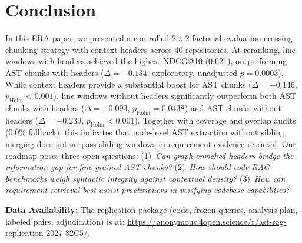 \section{Conclusion}
\label{sec:conclusion}
In this ERA paper, we presented a controlled $2 \times 2$ factorial evaluation crossing chunking strategy with context headers across 40 repositories. 
At reranking, line windows with headers achieved the highest NDCG@10 (0.621), outperforming AST chunks with headers ($\Delta = -0.134$; exploratory, unadjusted $p = 0.0003$). While context headers provide a substantial boost for AST chunks ($\Delta = +0.146$, $p_{\mathrm{Holm}} < 0.001$), line windows without headers significantly outperform both AST chunks with headers ($\Delta = -0.093$, $p_{\mathrm{Holm}} = 0.0438$) and AST chunks without headers ($\Delta = -0.239$, $p_{\mathrm{Holm}} < 0.001$). 
Together with coverage and overlap audits (0.0\% fallback), this indicates that node-level AST extraction without sibling merging does not surpass sliding windows in requirement evidence retrieval. 
Our roadmap poses three open questions: (1)~\textit{Can graph-enriched headers bridge the information gap for fine-grained AST chunks?} (2)~\textit{How should code-RAG benchmarks weigh syntactic integrity against contextual density?} (3)~\textit{How can requirement retrieval best assist practitioners in verifying codebase capabilities?}

\smallskip\noindent\textbf{Data Availability:} The replication package (code, frozen queries, analysis plan, labeled pairs, adjudication) is at: \url{https://anonymous.4open.science/r/ast-rag-replication-2027-82C5/}.

